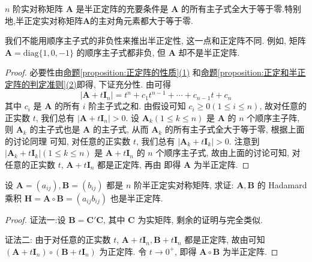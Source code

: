 \documentclass[../../main.tex]{subfiles}%
\begin{document}
\begin{proposition}\label{proposition:半正定阵关于顺序主子式的性质}
\(n\) 阶实对称矩阵 \(\boldsymbol{A}\) 是半正定阵的充要条件是 \(\boldsymbol{A}\) 的所有主子式全大于等于零.特别地,半正定实对称矩阵$\boldsymbol{A}$的主对角元素都大于等于零.
\end{proposition}
\begin{remark}
我们不能用顺序主子式的非负性来推出半正定性, 这一点和正定阵不同. 例如, 矩阵 \(\boldsymbol{A}=\text{diag}\{1,0,-1\}\) 的顺序主子式都非负, 但 \(\boldsymbol{A}\) 却不是半正定阵. 
\end{remark}
\begin{proof}

必要性由\hyperref[proposition:正定阵的性质]{命题\ref{proposition:正定阵的性质}(1)} 和\hyperref[proposition:正定和半正定阵的判定准则]{命题\ref{proposition:正定和半正定阵的判定准则}(2)}即得, 下证充分性. 由可得
\[|\boldsymbol{A}+t\boldsymbol{I}_n|=t^n + c_1t^{n - 1}+\cdots + c_{n - 1}t + c_n\]
其中 \(c_i\) 是 \(\boldsymbol{A}\) 的所有 \(i\) 阶主子式之和. 由假设可知 \(c_i\geqslant 0(1\leqslant  i\leqslant  n)\), 故对任意的正实数 \(t\), 我们总有 \(|\boldsymbol{A}+t\boldsymbol{I}_n|>0\). 设 \(\boldsymbol{A}_k(1\leqslant  k\leqslant  n)\) 是 \(\boldsymbol{A}\) 的 \(n\) 个顺序主子阵, 则 \(\boldsymbol{A}_k\) 的主子式也是 \(\boldsymbol{A}\) 的主子式, 从而 \(\boldsymbol{A}_k\) 的所有主子式全大于等于零, 根据上面的讨论同理 可知, 对任意的正实数 \(t\), 我们总有 \(|\boldsymbol{A}_k + t\boldsymbol{I}_k|>0\). 注意到 \(|\boldsymbol{A}_k + t\boldsymbol{I}_k|(1\leqslant  k\leqslant  n)\) 是 \(\boldsymbol{A}+t\boldsymbol{I}_n\) 的 \(n\) 个顺序主子式, 故由上面的讨论可知, 对任意的正实数 \(t\), \(\boldsymbol{A}+t\boldsymbol{I}_n\) 都是正定阵, 再由 即得 \(\boldsymbol{A}\) 为半正定阵. 

\end{proof}

\begin{proposition}\label{proposition:半正定阵的Hadamard乘积性质}
设 \(\boldsymbol{A}=(a_{ij}),\boldsymbol{B}=(b_{ij})\) 都是 \(n\) 阶半正定实对称矩阵, 求证: \(\boldsymbol{A},\boldsymbol{B}\) 的 Hadamard 乘积 \(\boldsymbol{H}=\boldsymbol{A}\circ\boldsymbol{B}=(a_{ij}b_{ij})\) 也是半正定阵.
\end{proposition}
\begin{proof}

{\color{blue}证法一:}设 \(\boldsymbol{B}=\boldsymbol{C}'\boldsymbol{C}\), 其中 \(\boldsymbol{C}\) 为实矩阵, 剩余的证明与完全类似.

{\color{blue}证法二:} 由于对任意的正实数 \(t\), \(\boldsymbol{A}+t\boldsymbol{I}_n,\boldsymbol{B}+t\boldsymbol{I}_n\) 都是正定阵, 故由可知 \((\boldsymbol{A}+t\boldsymbol{I}_n)\circ(\boldsymbol{B}+t\boldsymbol{I}_n)\) 为正定阵. 令 \(t\to0^+\), 即得 \(\boldsymbol{A}\circ\boldsymbol{B}\) 为半正定阵.

\end{proof}
\end{document}
